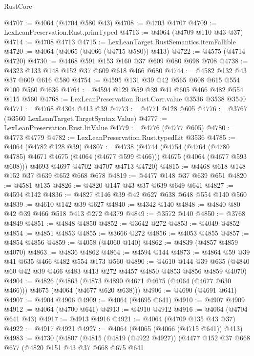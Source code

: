 \begin{lexlean}{RustCore}
\begin{coremodule}
@4707 := @4064 (@4704 @580 @43)
@4708 := @4703 @4707
@4709 := LexLeanPreservation.Rust.primTyped
@4713 := @4064 (@4709 @110 @43 @37)
@4714 := @4708 @4713
@4715 := LexLeanTarget.RustSemantics.itemFallible
@4720 := @4064 (@4065 (@4066 (@4715 @580)) @413)
@4722 := @4575 (@4714 @4720)
@4730 := @4468 @591 @153 @160 @37 @609 @680 @698 @708
@4738 := @4323 @133 @148 @152 @37 @609 @618 @466 @680
@4744 := @4582 @132 @43 @37 @609 @616 @580
@4754 := @4595 @131 @39 @42 @565 @608 @615 @554 @100 @560 @4636
@4764 := @4594 @129 @59 @39 @41 @605 @466 @482 @554 @115 @560
@4768 := LexLeanPreservation.Rust.Corr.value @3536 @3538 @3540
@4771 := @4768 @4304 @413 @39
@4773 := @4771 @128 @605
@4776 := @3767 (@3560 LexLeanTarget.TargetSyntax.Value)
@4777 := LexLeanPreservation.Rust.litValue
@4779 := @4776 (@4777 @605)
@4780 := @4773 @4779
@4782 := LexLeanPreservation.Rust.typedLit @3536
@4785 := @4064 (@4782 @128 @39)
@4807 := @4738
    (@4744
      (@4754
        (@4764 (@4780 @4785) @4671 @4675 (@4064 (@4677 @599 @466)))
        @4675
        (@4064 (@4677 @593 @608)))
      @4693
      @4697
      @4702
      @4707
      @4713
      @4720)
@4815 := @4468 @618 @148 @152 @37 @639 @652 @668 @678
@4819 := @4477 @148 @37 @639 @651
@4820 := @4581 @135
@4826 := @4820 @147 @43 @37 @639 @649 @641
@4827 := @4594 @142
@4836 := @4827 @146 @39 @42 @627 @638 @648 @554 @140 @560
@4839 := @4610 @142 @39 @627
@4840 := @4342 @140
@4848 := @4840 @80 @42 @39 @466 @518 @413 @272 @4379
@4849 := @3572 @140
@4850 := @3768 @4849
@4851 := @4848 @4850
@4852 := @3642 @272
@4853 := @4049 @4852
@4854 := @4851 @4853
@4855 := @3666 @272
@4856 := @4053 @4855
@4857 := @4854 @4856
@4859 := @4058 (@4060 @140)
@4862 := @4839 (@4857 @4859 @4070)
@4863 := @4836 @4862
@4864 := @4594 @144
@4873 := @4864 @59 @39 @41 @635 @466 @482 @554 @173 @560
@4890 := @4610
    @144
    @39
    @635
    (@4840 @60 @42 @39 @466 @483 @413 @272 @4457 @4850 @4853 @4856 @4859 @4070)
@4904 := @4826
    (@4863 (@4873 @4890 @4671 @4675 (@4064 (@4677 @630 @466))) @4675 (@4064 (@4677 @620 @638)))
@4906 := @4690 (@4691 @641)
@4907 := @4904 @4906
@4909 := @4064 (@4695 @641)
@4910 := @4907 @4909
@4912 := @4064 (@4700 @641)
@4913 := @4910 @4912
@4916 := @4064 (@4704 @641 @43)
@4917 := @4913 @4916
@4921 := @4064 (@4709 @135 @43 @37)
@4922 := @4917 @4921
@4927 := @4064 (@4065 (@4066 (@4715 @641)) @413)
@4983 := @4730
    (@4807
      (@4815
        (@4819 (@4922 @4927))
        (@4477
          @152
          @37
          @668
          @677
          (@4820
            @151
            @43
            @37
            @668
            @675
            @641

\end{coremodule}
\end{lexlean}
